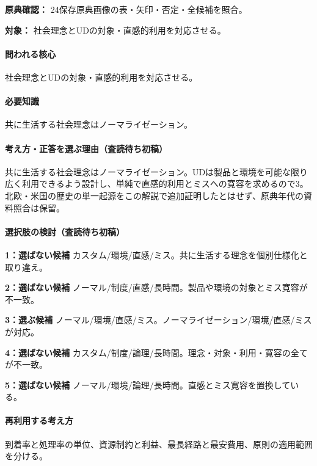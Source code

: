\noindent\textbf{原典確認：} 24保存原典画像の表・矢印・否定・全候補を照合。\par

\noindent\textbf{対象：} 社会理念とUDの対象・直感的利用を対応させる。\par

\paragraph{問われる核心} 社会理念とUDの対象・直感的利用を対応させる。

\paragraph{必要知識} 共に生活する社会理念はノーマライゼーション。

\paragraph{考え方・正答を選ぶ理由（査読待ち初稿）} 共に生活する社会理念はノーマライゼーション。UDは製品と環境を可能な限り広く利用できるよう設計し、単純で直感的利用とミスへの寛容を求めるので3。北欧・米国の歴史の単一起源をこの解説で追加証明したとはせず、原典年代の資料照合は保留。

\paragraph{選択肢の検討（査読待ち初稿）}\mbox{}\par

\noindent\textbf{1：選ばない候補} カスタム/環境/直感/ミス。共に生活する理念を個別仕様化と取り違え。\par

\noindent\textbf{2：選ばない候補} ノーマル/制度/直感/長時間。製品や環境の対象とミス寛容が不一致。\par

\noindent\textbf{3：選ぶ候補} ノーマル/環境/直感/ミス。ノーマライゼーション/環境/直感/ミスが対応。\par

\noindent\textbf{4：選ばない候補} カスタム/制度/論理/長時間。理念・対象・利用・寛容の全てが不一致。\par

\noindent\textbf{5：選ばない候補} ノーマル/環境/論理/長時間。直感とミス寛容を置換している。\par

\paragraph{再利用する考え方} 到着率と処理率の単位、資源制約と利益、最長経路と最安費用、原則の適用範囲を分ける。

